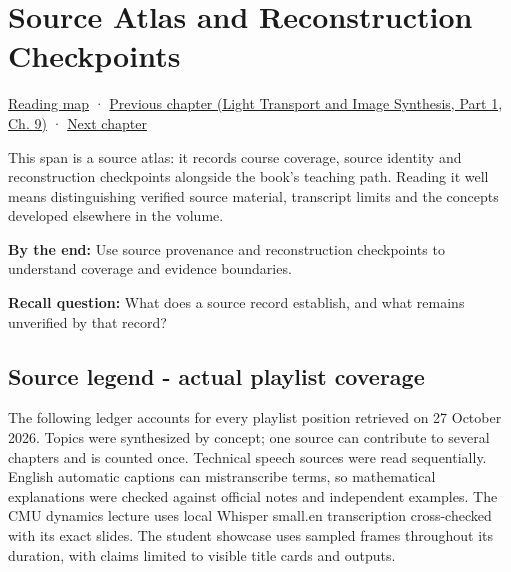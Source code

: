 \chapter{Source Atlas and Reconstruction Checkpoints}\label{04-visual-computing-ii-ch036-source-atlas-and-reconstruction-checkpoints}\hypertarget{04-visual-computing-ii-ch036}{}\label{stagechapter:04-visual-computing-ii-ch036}

\hypertarget{04-visual-computing-ii-ch036-source-atlas-and-reconstruction-checkpoints}{}

\hyperref[volume-reading-map]{Reading map} · \href{../04-Light-Transport-and-Image-Synthesis-P01/main.pdf\#nameddest=04-visual-computing-ii-ch035-a-complete-renderer-as-an-executable-forward-model}{Previous chapter (Light Transport and Image Synthesis, Part 1, Ch. 9)} · \hyperref[04-visual-computing-ii-ch037-gaussian-splatting-and-editable-captured-worlds]{Next chapter}

This span is a source atlas: it records course coverage, source identity and reconstruction checkpoints alongside the book's teaching path. Reading it well means distinguishing verified source material, transcript limits and the concepts developed elsewhere in the volume.

\textbf{By the end:} Use source provenance and reconstruction checkpoints to understand coverage and evidence boundaries.

\textbf{Recall question:} What does a source record establish, and what remains unverified by that record?

\section{Source legend - actual playlist coverage}\label{04-visual-computing-ii-ch036-source-legend---actual-playlist-coverage}

\hypertarget{04-visual-computing-ii-ch036-source-legend---actual-playlist-coverage}{}

The following ledger accounts for every playlist position retrieved on 27 October 2026. Topics were synthesized by concept; one source can contribute to several chapters and is counted once. Technical speech sources were read sequentially. English automatic captions can mistranscribe terms, so mathematical explanations were checked against official notes and independent examples. The CMU dynamics lecture uses local Whisper small.en transcription cross-checked with its exact slides. The student showcase uses sampled frames throughout its duration, with claims limited to visible title cards and outputs.

